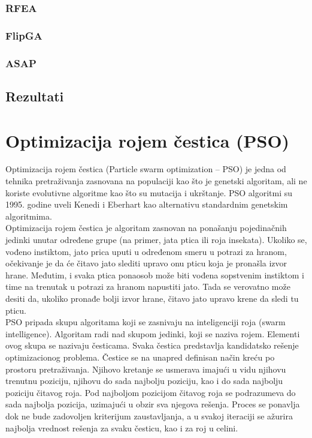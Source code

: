 \documentclass{article}
\begin{document}
\subsubsection{RFEA}

\subsubsection{FlipGA}

\subsubsection{ASAP}


\subsection{Rezultati}



\section{Optimizacija rojem čestica (PSO)}
Optimizacija rojem čestica (Particle swarm optimization – PSO) je jedna od tehnika pretraživanja zasnovana na populaciji kao što je genetski algoritam, ali ne koriste evolutivne algoritme kao što su mutacija i ukrštanje.
PSO algoritmi su 1995. godine uveli Kenedi i Eberhart kao alternativu standardnim genetskim algoritmima. \\

Optimizacija rojem čestica je algoritam zasnovan na ponašanju pojedinačnih jedinki unutar određene grupe (na primer, jata ptica ili roja insekata). Ukoliko se, vođeno instiktom, jato prica uputi u određenom smeru u potrazi za hranom, očekivanje je da će čitavo jato slediti upravo onu pticu koja je pronašla izvor hrane. Međutim, i svaka ptica ponaosob može biti vođena sopstvenim instiktom i time na trenutak u potrazi za hranom napustiti jato. Tada se verovatno može desiti da, ukoliko pronađe bolji izvor hrane, čitavo jato upravo krene da sledi tu pticu. \\

PSO pripada skupu algoritama koji se zasnivaju na inteligenciji roja (swarm intelligence). Algoritam radi nad skupom jedinki, koji se naziva rojem. Elementi ovog skupa se nazivaju česticama. 
Svaka čestica predstavlja kandidatsko rešenje optimizacionog problema. Čestice se na unapred definisan način kreću po prostoru pretraživanja. Njihovo kretanje se usmerava imajući u vidu njihovu trenutnu poziciju, njihovu do sada najbolju poziciju, kao i do sada najbolju poziciju čitavog roja. Pod najboljom pozicijom čitavog roja se podrazumeva do sada najbolja pozicija, uzimajući u obzir sva njegova rešenja. Proces se ponavlja dok ne bude zadovoljen kriterijum zaustavljanja, a u svakoj iteraciji se ažurira najbolja vrednost rešenja za svaku česticu, kao i za roj u celini. \\
\end{document}
